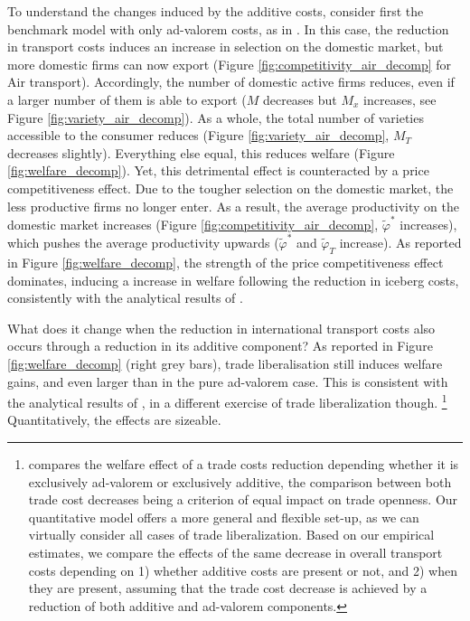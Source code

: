 \documentclass[a4paper,11pt]{article}
\begin{document}
To understand the changes induced by the additive costs, consider first the benchmark model with only ad-valorem costs, as in \cite{melitz}. In this case, the reduction in transport costs induces an increase in selection on the domestic market, but more domestic firms can now export (Figure \ref{fig:competitivity_air_decomp} for Air transport). Accordingly, the number of domestic active firms reduces, even if a larger number of them is able to export ($M$ decreases but $M_x$ increases, see Figure \ref{fig:variety_air_decomp}). As a whole, the total number of varieties accessible to the consumer reduces (Figure \ref{fig:variety_air_decomp}, $M_T$ decreases slightly). Everything else equal, this reduces welfare (Figure \ref{fig:welfare_decomp}). Yet, this detrimental effect is counteracted by a price competitiveness effect. Due to the tougher selection on the domestic market, the less productive firms no longer enter. As a result, the average productivity on the domestic market increases (Figure \ref{fig:competitivity_air_decomp}, $\widetilde{\varphi}^\ast$ increases), which pushes the average productivity upwards ($\widetilde{\varphi}^\ast$ and $\widetilde{\varphi}_T$ increase). As reported in Figure \ref{fig:welfare_decomp}, the strength of the price competitiveness effect dominates, inducing a increase in welfare following the reduction in iceberg costs, consistently with the analytical results of \cite{melitz}.

What does it change when the reduction in international transport costs also occurs through a reduction in its additive component? As reported in Figure \ref{fig:welfare_decomp} (right grey bars), trade liberalisation still induces welfare gains, and even larger than in the pure ad-valorem case. This is consistent with the analytical results of \cite{sorensen2014}, in a different exercise of trade liberalization though. \footnote{\cite{sorensen2014} compares the welfare effect of a trade costs reduction depending whether it is exclusively ad-valorem or exclusively additive, the comparison between both trade cost decreases being a criterion of equal impact on trade openness. Our quantitative model offers a more general and flexible set-up, as we can virtually consider all cases of trade liberalization. Based on our empirical estimates, we compare the effects of the same decrease in overall transport costs depending on 1) whether additive costs are present or not, and 2) when they are present, assuming that the trade cost decrease is achieved by a reduction of both additive and ad-valorem components.} Quantitatively, the effects are sizeable.
\end{document}
